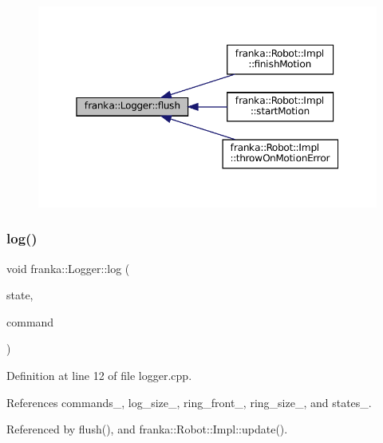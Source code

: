 \nopagebreak
\begin{figure}[H]
\begin{center}
\leavevmode
\includegraphics[width=350pt]{classfranka_1_1Logger_a44b15a95e25dabe93f797c1d9651fb6e_icgraph}
\end{center}
\end{figure}
\mbox{\label{classfranka_1_1Logger_aee4bfea6a4081c4ed9ee2abd2f62a0cd}} 
\subsubsection{\texorpdfstring{log()}{log()}}
{\footnotesize\ttfamily void franka\+::\+Logger\+::log (\begin{DoxyParamCaption}\item[{const \hyperlink{structfranka_1_1RobotState}{Robot\+State} \&}]{state,  }\item[{const \hyperlink{structresearch__interface_1_1robot_1_1RobotCommand}{research\+\_\+interface\+::robot\+::\+Robot\+Command} \&}]{command }\end{DoxyParamCaption})}



Definition at line 12 of file logger.\+cpp.



References commands\+\_\+, log\+\_\+size\+\_\+, ring\+\_\+front\+\_\+, ring\+\_\+size\+\_\+, and states\+\_\+.



Referenced by flush(), and franka\+::\+Robot\+::\+Impl\+::update().


